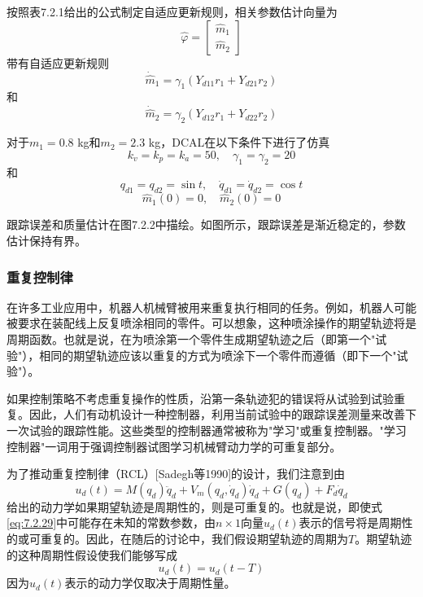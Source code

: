 \documentclass[UTF8]{ctexart}
\begin{document}
按照表7.2.1给出的公式制定自适应更新规则，相关参数估计向量为
\begin{equation*}
\hat{\varphi} = \begin{bmatrix} \hat{m}_1 \\ \hat{m}_2 \end{bmatrix}
\end{equation*}
带有自适应更新规则
\begin{equation}
\dot{\hat{m}}_1 = \gamma_1(Y_{d11}r_1 + Y_{d21}r_2)
\end{equation}
和
\begin{equation}
\dot{\hat{m}}_2 = \gamma_2(Y_{d12}r_1 + Y_{d22}r_2)
\end{equation}

对于$m_1=0.8$ kg和$m_2=2.3$ kg，DCAL在以下条件下进行了仿真
\begin{equation*}
k_v = k_p = k_a = 50, \quad \gamma_1 = \gamma_2 = 20
\end{equation*}
和
\begin{equation*}
q_{d1} = q_{d2} = \sin t, \quad \dot{q}_{d1} = \dot{q}_{d2} = \cos t
\end{equation*}
\begin{equation*}
\hat{m}_1(0) = 0, \quad \hat{m}_2(0) = 0
\end{equation*}

跟踪误差和质量估计在图7.2.2中描绘。如图所示，跟踪误差是渐近稳定的，参数估计保持有界。

\subsubsection*{重复控制律}

在许多工业应用中，机器人机械臂被用来重复执行相同的任务。例如，机器人可能被要求在装配线上反复喷涂相同的零件。可以想象，这种喷涂操作的期望轨迹将是周期函数。也就是说，在为喷涂第一个零件生成期望轨迹之后（即第一个"试验"），相同的期望轨迹应该以重复的方式为喷涂下一个零件而遵循（即下一个"试验"）。

如果控制策略不考虑重复操作的性质，沿第一条轨迹犯的错误将从试验到试验重复。因此，人们有动机设计一种控制器，利用当前试验中的跟踪误差测量来改善下一次试验的跟踪性能。这些类型的控制器通常被称为"学习"或重复控制器。"学习控制器"一词用于强调控制器试图学习机械臂动力学的可重复部分。

为了推动重复控制律（RCL）[Sadegh等1990]的设计，我们注意到由
\begin{equation}\label{eq:7.2.29}
u_d(t) = M(q_d)\ddot{q}_d + V_m(q_d,\dot{q}_d)\dot{q}_d + G(q_d) + F_d\dot{q}_d
\end{equation}
给出的动力学如果期望轨迹是周期性的，则是可重复的。也就是说，即使式\eqref{eq:7.2.29}中可能存在未知的常数参数，由$n \times 1$向量$u_d(t)$表示的信号将是周期性的或可重复的。因此，在随后的讨论中，我们假设期望轨迹的周期为$T$。期望轨迹的这种周期性假设使我们能够写成
\begin{equation}\label{eq:7.2.30}
u_d(t) = u_d(t-T)
\end{equation}
因为$u_d(t)$表示的动力学仅取决于周期性量。
\end{document}

